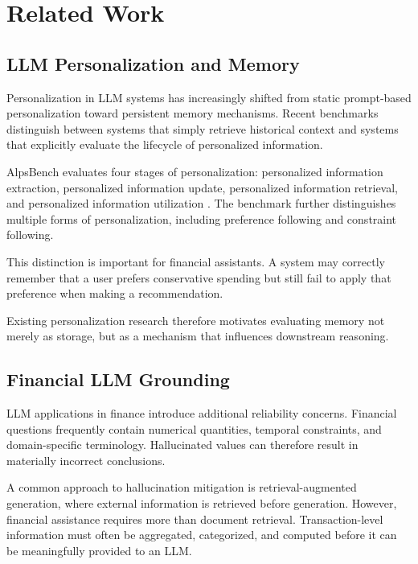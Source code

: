\documentclass[conference]{IEEEtran}
\begin{document}
    
    \section{Related Work}
    
    \subsection{LLM Personalization and Memory}
    
    Personalization in LLM systems has increasingly shifted from static
    prompt-based personalization toward persistent memory mechanisms.
    Recent benchmarks distinguish between systems that simply retrieve
    historical context and systems that explicitly evaluate the lifecycle
    of personalized information.
    
    AlpsBench evaluates four stages of personalization: personalized
    information extraction, personalized information update, personalized
    information retrieval, and personalized information utilization
    \cite{alpsbench}. The benchmark further distinguishes multiple forms of
    personalization, including preference following and constraint
    following.
    
    This distinction is important for financial assistants. A system may
    correctly remember that a user prefers conservative spending but still
    fail to apply that preference when making a recommendation.
    
    Existing personalization research therefore motivates evaluating memory
    not merely as storage, but as a mechanism that influences downstream
    reasoning.
    
    \subsection{Financial LLM Grounding}
    
    LLM applications in finance introduce additional reliability concerns.
    Financial questions frequently contain numerical quantities, temporal
    constraints, and domain-specific terminology. Hallucinated values can
    therefore result in materially incorrect conclusions.
    
    A common approach to hallucination mitigation is retrieval-augmented
    generation, where external information is retrieved before generation.
    However, financial assistance requires more than document retrieval.
    Transaction-level information must often be aggregated, categorized, and
    computed before it can be meaningfully provided to an LLM.
    
\end{document}
